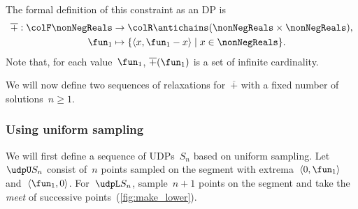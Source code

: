 
The formal definition of this constraint as an DP is
\begin{align*}
    \overline{+}:{\colF\nonNegReals} & \rightarrow{\colR\antichains(\nonNegReals\times\nonNegReals)},\\
    \fun_{1} & \mapsto\{\left\langle x,\fun_{1}-x\right\rangle \mid x\in\nonNegReals\}.
\end{align*}
Note that, for each value~$\fun_{1}$, $\overline{+}(\fun_{1})$
is a set of infinite cardinality.

We will now define two sequences of relaxations for~$\overline{+}$
with a fixed number of solutions~$n\geq1$.

\subsubsection*{Using uniform sampling}

We will first define a sequence of UDPs~$S_{n}$ based on uniform
sampling. Let~$\udpU S_{n}$ consist of~$n$ points sampled on the
segment with extrema~$\left\langle 0,\fun_{1}\right\rangle $ and~$\left\langle \fun_{1},0\right\rangle $.
For~$\udpL S_{n}$, sample~$n+1$ points on the segment and take
the \emph{meet} of successive points~(\cref{fig:make_lower}).
\begin{center}
    \par
\end{center}

